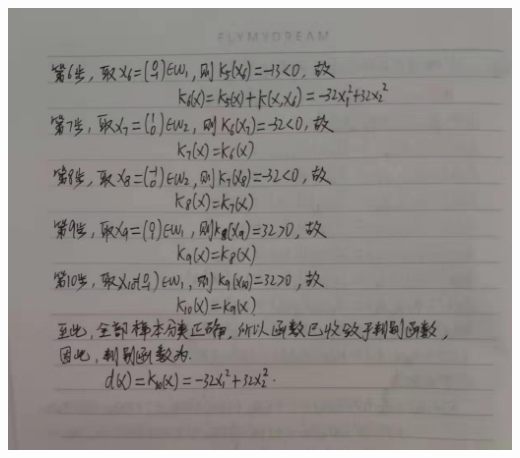 \documentclass[a4paper, UTF8, 12pt]{ctexart}
\begin{document}
    \includegraphics[scale=0.4]{asw7_1.jpg} \\ \\
\end{document}
